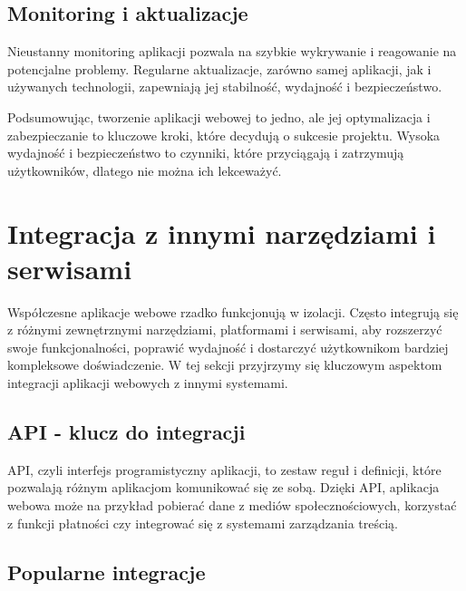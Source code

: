 \subsection{Monitoring i aktualizacje}

Nieustanny monitoring aplikacji pozwala na szybkie wykrywanie i reagowanie na potencjalne problemy. Regularne aktualizacje, zarówno samej aplikacji, jak i używanych technologii, zapewniają jej stabilność, wydajność i bezpieczeństwo.

Podsumowując, tworzenie aplikacji webowej to jedno, ale jej optymalizacja i zabezpieczanie to kluczowe kroki, które decydują o sukcesie projektu. Wysoka wydajność i bezpieczeństwo to czynniki, które przyciągają i zatrzymują użytkowników, dlatego nie można ich lekceważyć.

\section{Integracja z innymi narzędziami i serwisami}

Współczesne aplikacje webowe rzadko funkcjonują w izolacji. Często integrują się z różnymi zewnętrznymi narzędziami, platformami i serwisami, aby rozszerzyć swoje funkcjonalności, poprawić wydajność i dostarczyć użytkownikom bardziej kompleksowe doświadczenie. W tej sekcji przyjrzymy się kluczowym aspektom integracji aplikacji webowych z innymi systemami.

\subsection{API - klucz do integracji}

API, czyli interfejs programistyczny aplikacji, to zestaw reguł i definicji, które pozwalają różnym aplikacjom komunikować się ze sobą. Dzięki API, aplikacja webowa może na przykład pobierać dane z mediów społecznościowych, korzystać z funkcji płatności czy integrować się z systemami zarządzania treścią.

\subsection{Popularne integracje}

